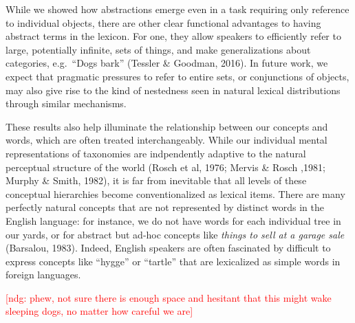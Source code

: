 \documentclass[10pt,letterpaper]{article}
\newcommand{\ndg}[1]{\textcolor{Green}{[ndg: #1]}}
\newcommand{\mf}[1]{\textcolor{Red}{[ndg: #1]}}
\begin{document}
While we showed how abstractions emerge even in a task requiring only reference to individual objects, there are other clear functional advantages to having abstract terms in the lexicon. For one, they allow speakers to efficiently refer to large, potentially infinite, sets of things, and make generalizations about categories, e.g.\ ``Dogs bark'' (Tessler \& Goodman, 2016). In future work, we expect that pragmatic pressures to refer to entire sets, or conjunctions of objects, may also give rise to the kind of nestedness seen in natural lexical distributions through similar mechanisms.

These results also help illuminate the relationship between our concepts and words, which are often treated interchangeably. While our individual mental representations of taxonomies are indpendently adaptive to the natural perceptual structure of the world (Rosch et al, 1976; Mervis \& Rosch ,1981; Murphy \& Smith, 1982), it is far from inevitable that all levels of these conceptual hierarchies become conventionalized as lexical items. There are many perfectly natural concepts that are not represented by distinct words in the English language: for instance, we do not have words for each individual tree in our yards, or for abstract but ad-hoc concepts like \emph{things to sell at a garage sale} (Barsalou, 1983). Indeed, English speakers are often fascinated by difficult to express concepts like ``hygge'' or ``tartle'' that are lexicalized as simple words in foreign languages.


\mf{phew, not sure there is enough space and hesitant that this might wake sleeping dogs, no matter how careful we are}
\end{document}
